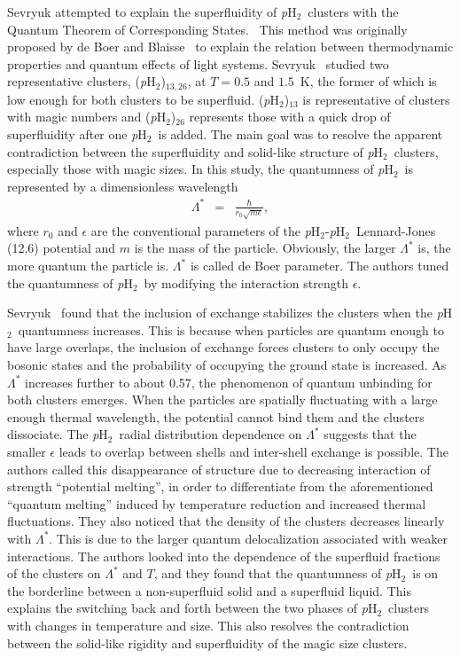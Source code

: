 \documentclass[12pt]{iopart}
\newcommand{\phtwo}{{\em p}H$_2$}
\begin{document}
Sevryuk \etal\cite{why_superfluid_pH2} attempted to explain the superfluidity of \phtwo~clusters with the Quantum Theorem of Corresponding States.~\cite{dyugaev_corresponding1,dyugaev_corresponding2} 
This method was originally proposed by de Boer and Blaisse~\cite{deboer_qtcs_1,deboer_qtcs_2} to explain the relation between thermodynamic properties and quantum effects of light systems. 
Sevryuk \etal~studied two representative clusters, (\phtwo)$_{13,26}$, at $T=0.5$ and $1.5$~K, the former of which is low enough for both clusters to be superfluid. (\phtwo)$_{13}$ is representative of clusters with magic numbers and (\phtwo)$_{26}$ represents those with a quick drop of superfluidity after one \phtwo~is added. 
The main goal was to resolve the apparent contradiction between the superfluidity and solid-like structure of \phtwo~clusters, especially those with magic sizes. 
In this study, the quantumness of \phtwo~is represented by a dimensionless wavelength
\begin{eqnarray}
\Lambda^*&=&\frac{\hbar}{r_0\sqrt{m\epsilon}},
\end{eqnarray}
where $r_0$ and $\epsilon$ are the conventional parameters of the \phtwo-\phtwo~Lennard-Jones (12,6) potential and $m$ is the mass of the particle. 
Obviously, the larger $\Lambda^*$ is, the more quantum the particle is.
$\Lambda^*$ is called de Boer parameter. 
The authors tuned the quantumness of \phtwo~by modifying the interaction strength $\epsilon$.

Sevryuk \etal~found that the inclusion of exchange stabilizes the clusters when the \phtwo~quantumness increases. This is because when particles are quantum enough to have large overlaps, the inclusion of exchange forces clusters to only occupy the bosonic states and the probability of occupying the ground state is increased. As $\Lambda^*$ increases further to about 0.57, the phenomenon of quantum unbinding for both clusters emerges. 
When the particles are spatially fluctuating with a large enough thermal wavelength, the potential cannot bind them and the clusters dissociate. 
The \phtwo~radial distribution dependence on $\Lambda^*$ suggests that the smaller $\epsilon$ leads to overlap between shells and inter-shell exchange is possible. The authors called this disappearance of structure due to decreasing interaction of strength ``potential melting'', in order to differentiate from the aforementioned ``quantum melting'' induced by temperature reduction and increased thermal fluctuations. 
They also noticed that the density of the clusters decreases linearly with $\Lambda^*$. 
This is due to the larger quantum delocalization associated with weaker interactions. 
The authors looked into the dependence of the superfluid fractions of the clusters on $\Lambda^*$ and $T$, and they found that the quantumness of \phtwo~is on the borderline between a non-superfluid solid and a superfluid liquid. 
This explains the switching back and forth between the two phases of \phtwo~clusters with changes in temperature and size. This also resolves the contradiction between the solid-like rigidity and superfluidity of the magic size clusters.
\end{document}
